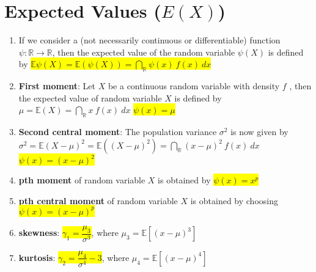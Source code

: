 \section{Expected Values ($E(X)$)}

\begin{enumerate}
    \item If we consider a (not necessarily continuous or differentiable) function $\psi : \mathbb{R} \to \mathbb{R}$, then the expected value of the random variable $\psi (X)$ is defined by
    \colorbox{yellow}{$
        \mathbb{E}\psi(X) 
        = \mathbb{E}(\psi(X))
        = \dint_{\mathbb{R}} \psi(x)\ f(x)\ dx
    $}
    \hfill \cite{statistics/book/Statistics-for-Data-Scientists/Maurits-Kaptein}
    
    \item \textbf{First moment}: Let $X$ be a continuous random variable with density $f$ , then the expected value of random variable $X$ is defined by
    $
        \mu 
        = \mathbb{E}(X) 
        = \dint_{\mathbb{R}} x\ f(x)\ dx
    $
    \hfill \colorbox{yellow}{$\psi(x)=\mu$}
    \hfill \cite{statistics/book/Statistics-for-Data-Scientists/Maurits-Kaptein}

    \item \textbf{Second central moment}: The population variance $\sigma^ 2$ is now given by 
    $
        \sigma^ 2 
        = \mathbb{E}(X - \mu)^2
        = \mathbb{E}((X - \mu)^2)
        = \dint_{\mathbb{R}} (x - \mu)^2\ f(x)\ dx
    $
    \hfill \colorbox{yellow}{$\psi(x)=(x -\mu)^2$}
    \hfill \cite{statistics/book/Statistics-for-Data-Scientists/Maurits-Kaptein}

    \item \textbf{pth moment} of random variable $X$ is obtained by \colorbox{yellow}{$\psi(x) = x^p$}
    \hfill \cite{statistics/book/Statistics-for-Data-Scientists/Maurits-Kaptein}

    \item \textbf{pth central moment} of random variable $X$ is obtained by choosing \colorbox{yellow}{$\psi(x) = (x - \mu)^p$}
    \hfill \cite{statistics/book/Statistics-for-Data-Scientists/Maurits-Kaptein}

    \item \textbf{skewness}: \colorbox{yellow}{$\gamma_1 = \dfrac{\mu_3}{\sigma^3}$}, where $\mu_3 = \mathbb{E}[(x-\mu)^3]$
    \hfill \cite{statistics/book/Statistics-for-Data-Scientists/Maurits-Kaptein}

    \item \textbf{kurtosis}: \colorbox{yellow}{$\gamma_2 = \dfrac{\mu_4}{\sigma^4} - 3$}, where $\mu_4 = \mathbb{E}[(x-\mu)^4]$
    \hfill \cite{statistics/book/Statistics-for-Data-Scientists/Maurits-Kaptein}
\end{enumerate}















